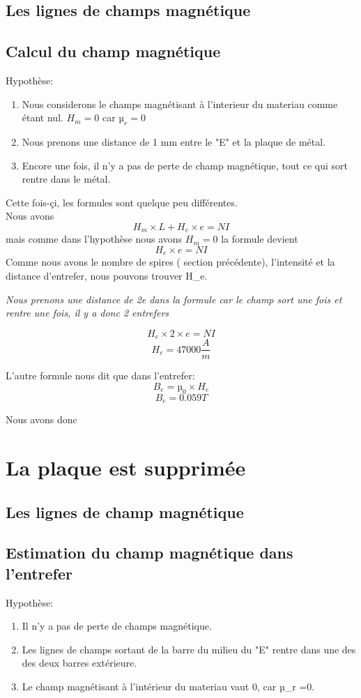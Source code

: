 \documentclass{report}
\begin{document}
\section{Les lignes de champs magnétique}
\section{Calcul du champ magnétique}

Hypothèse:
\begin{enumerate}
\item Nous considerons le champs magnétisant à l'interieur du materiau comme étant nul.  $H_{m} = 0$ car $µ_{r}=0$
\item Nous prenons une distance de 1 mm entre le "E" et la plaque de métal.
\item Encore une fois, il n'y a pas de perte de champ magnétique, tout ce qui sort rentre dans le métal.
\end{enumerate}

Cette fois-çi, les formules sont quelque peu différentes.
\\
Nous avons \[H_{m}\times L + H_{e} \times e = NI\] mais comme dans l'hypothèse nous avons $H_{m}=0$ la formule devient 
\[H_{e} \times e = NI\]  
Comme nous avons le nombre de spires ( section précédente), l'intensité et la distance d'entrefer, nous pouvons trouver H_{e}.

\emph{Nous prenons une distance de 2e dans la formule car le champ sort une fois et rentre une fois, il y a donc 2 entrefers}

\[H_{e} \times 2 \times e = N I\]
\[H_{e}= 47000 \frac{A}{m}\]

L'autre formule nous dit que dans l'entrefer:\[ B_{e} = µ_{0} \times H_{e}\]
\[B_{e} = 0.059 T\]

Nous avons donc 

\chapter{La plaque est supprimée}
\section{Les lignes de champ magnétique}
\section{ Estimation du champ magnétique dans l'entrefer}

Hypothèse:
\begin{enumerate}
\item Il n'y a pas de perte de champs magnétique.
\item Les lignes de champs sortant de la barre du milieu du "E" rentre dans une des des deux barres extérieure.
\item Le champ magnétisant à l'intérieur du materiau vaut 0, car µ_{r} =0.
\end{enumerate}
\end{document}
